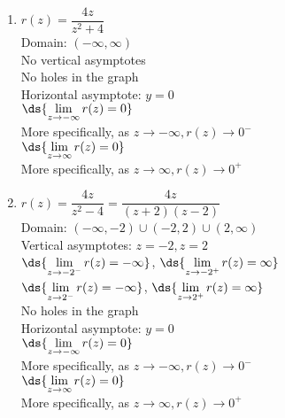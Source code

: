 \documentclass{ximera}
\begin{document}
\begin{multicols}{2}
\begin{enumerate}
\setcounter{enumi}{\value{HW}}

\item $r(z) = \dfrac{4z}{z^{2} + 4}$\\
Domain: $(-\infty,  \infty)$\\
No vertical asymptotes \\
No holes in the graph\\
Horizontal asymptote: $y = 0$ \\
$\ds{\lim_{z \rightarrow - \infty} r(z) =0}$\\
More specifically, as $z \rightarrow -\infty, r(z) \rightarrow 0^{-}$\\
$\ds{\lim_{z \rightarrow  \infty} r(z) =0}$\\
More specifically, as $z \rightarrow \infty, r(z) \rightarrow 0^{+}$\\


\vfill

\columnbreak

\item $r(z) = \dfrac{4z}{z^{2} -4} = \dfrac{4z}{(z + 2)(z - 2)}$\\
Domain: $(-\infty, -2) \cup (-2, 2) \cup (2, \infty)$\\
Vertical asymptotes: $z = -2, z = 2$\\
$\ds{\lim_{z \rightarrow -2^{-}} r(z)=  -\infty}$, $\ds{\lim_{z \rightarrow -2^{+}} r(z)=  \infty}$ \\
$\ds{\lim_{z \rightarrow 2^{-}} r(z)=  -\infty}$, $\ds{\lim_{z \rightarrow 2^{+}}  r(z)=  \infty}$  \\
No holes in the graph\\
Horizontal asymptote: $y = 0$ \\
$\ds{\lim_{z \rightarrow -\infty} r(z) =0}$\\
More specifically, as $z \rightarrow -\infty, r(z) \rightarrow 0^{-}$\\
$\ds{\lim_{z \rightarrow \infty} r(z) =0}$\\
More specifically, as $z \rightarrow \infty, r(z) \rightarrow 0^{+}$\\

\setcounter{HW}{\value{enumi}}
\end{enumerate}
\end{multicols}
\end{document}
